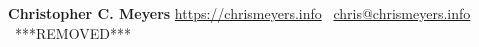 
\begin{flushleft}
{\LARGE \textbf{Christopher C. Meyers}}
\hfill
\href{https://chrismeyers.info}{https://chrismeyers.info} \textbullet \ \href{mailto:chris@chrismeyers.info}{chris@chrismeyers.info} \textbullet \ ***REMOVED***
\end{flushleft}
